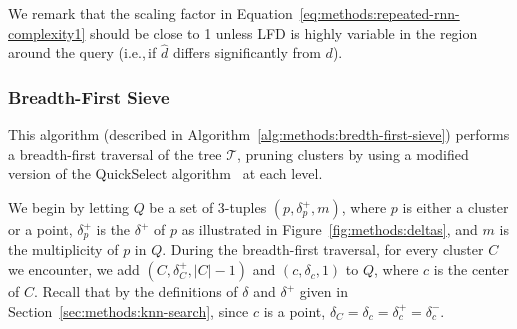 We remark that the scaling factor in Equation~\ref{eq:methods:repeated-rnn-complexity1} should be close to 1 unless LFD is highly variable in the region around the query (i.e.,\,if $\hat{d}$ differs significantly from $d$).


\subsubsection{Breadth-First Sieve}
\label{sec:methods:knn-search:bredth-first-sieve}

This algorithm (described in Algorithm~\ref{alg:methods:bredth-first-sieve}) performs a breadth-first traversal of the tree $\mathcal{T}$, pruning clusters by using a modified version of the QuickSelect algorithm~\cite{hoare1961algorithm} at each level.

We begin by letting $Q$ be a set of 3-tuples $(p, \delta^{+}_{p}, m)$, where $p$ is either a cluster or a point, $\delta^{+}_{p}$ is the $\delta^{+}$ of $p$ as illustrated in Figure~\ref{fig:methods:deltas}, and $m$ is the multiplicity of $p$ in $Q$.
During the breadth-first traversal, for every cluster $C$ we encounter, we add $(C, \delta^{+}_{C}, |C| - 1)$ and $(c, \delta_{c}, 1)$ to $Q$, where $c$ is the center of $C$.
Recall that by the definitions of $\delta$ and $\delta^{+}$ given in Section~\ref{sec:methods:knn-search}, since $c$ is a point, $\delta_{C} = \delta_{c} = \delta^{+}_{c} = \delta^{-}_{c}$.

